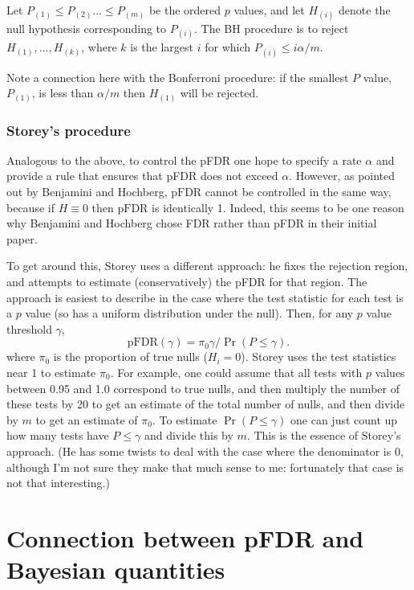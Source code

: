 \documentclass[times,11pt]{article}
\def\pFDR{\text{pFDR}}
\begin{document}
Let $P_{(1)} \leq P_{(2)} \dots \leq P_{(m)}$ be the ordered $p$ values, and let $H_{(i)}$ denote the null hypothesis corresponding to $P_{(i)}$.  
The BH procedure is to reject $H_{(1)},\dots,H_{(k)}$, where $k$ is the largest $i$ for which $P_{(i)} \leq i\alpha/m$.

Note a connection here with the Bonferroni procedure: if the smallest $P$ value, $P_{(1)}$,
is less than $\alpha/m$ then $H_{(1)}$ will be rejected. 





\subsubsection{Storey's procedure}

Analogous to the above, to control the pFDR one hope to specify a rate $\alpha$ and provide a rule that ensures that pFDR does not exceed $\alpha$. However, as pointed out by Benjamini and Hochberg, $\pFDR$ cannot be controlled in the same way, because if $H \equiv 0$ then $\pFDR$ is identically 1. Indeed, this seems to be one reason why Benjamini and Hochberg chose FDR rather than pFDR in their initial paper.

To get around this, Storey uses a different approach: he fixes the rejection region, and attempts to estimate
(conservatively) the pFDR for that region. The approach is easiest to describe in the case where the test statistic for each test is a $p$ value (so has a uniform distribution under the null).
Then, for any $p$ value threshold $\gamma$, 
\begin{equation}
\pFDR(\gamma) = \pi_0 \gamma/ \Pr(P \leq \gamma).
\end{equation}
where $\pi_0$ is the proportion of true nulls ($H_i=0$).
Storey uses the test statistics near 1 to estimate $\pi_0$. For example, one could assume that all tests with $p$ values between 0.95 and 1.0 correspond to true nulls, and then multiply the number of these tests by 20 to get an estimate of the total number of nulls, and then divide by $m$ to get an estimate of $\pi_0$. To estimate $\Pr(P \leq \gamma)$ one can just count up how many tests have $P \leq \gamma$ and divide this by $m$. This is the essence of Storey's approach. (He has some twists to deal with the case where the denominator is 0, although I'm not sure they make that much sense to me: fortunately that case is not that interesting.)

\section{Connection between pFDR and Bayesian quantities}
\end{document}
